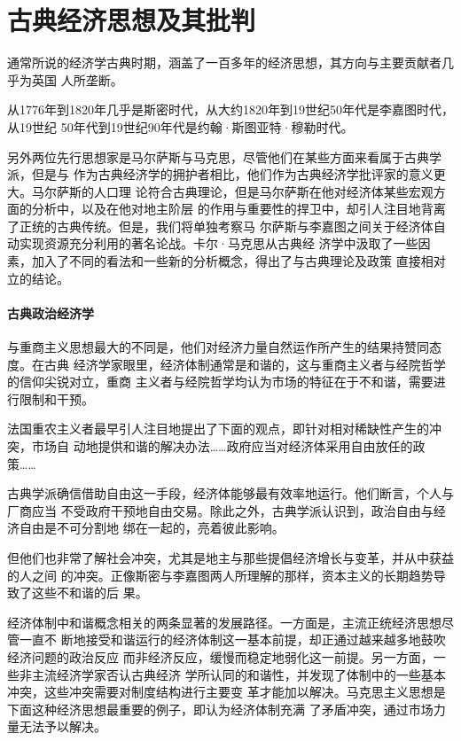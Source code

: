 \part{古典经济思想及其批判}

通常所说的经济学古典时期，涵盖了一百多年的经济思想，其方向与主要贡献者几乎为英国
人所垄断。

从1776年到1820年几乎是斯密时代，从大约1820年到19世纪50年代是李嘉图时代，从19世纪
50年代到19世纪90年代是约翰·斯图亚特·穆勒时代。

另外两位先行思想家是马尔萨斯与马克思，尽管他们在某些方面来看属于古典学派，但是与
作为古典经济学的拥护者相比，他们作为古典经济学批评家的意义更大。马尔萨斯的人口理
论符合古典理论，但是马尔萨斯在他对经济体某些宏观方面的分析中，以及在他对地主阶层
的作用与重要性的捍卫中，却引人注目地背离了正统的古典传统。但是，我们将单独考察马
尔萨斯与李嘉图之间关于经济体自动实现资源充分利用的著名论战。卡尔·马克思从古典经
济学中汲取了一些因素，加入了不同的看法和一些新的分析概念，得出了与古典理论及政策
直接相对立的结论。

\subsection{古典政治经济学}

与重商主义思想最大的不同是，他们对经济力量自然运作所产生的结果持赞同态度。在古典
经济学家眼里，经济体制通常是和谐的，这与重商主义者与经院哲学的信仰尖锐对立，重商
主义者与经院哲学均认为市场的特征在于不和谐，需要进行限制和干预。

法国重农主义者最早引人注目地提出了下面的观点，即针对相对稀缺性产生的冲突，市场自
动地提供和谐的解决办法……政府应当对经济体采用自由放任的政策……

古典学派确信借助自由这一手段，经济体能够最有效率地运行。他们断言，个人与厂商应当
不受政府干预地自由交易。除此之外，古典学派认识到，政治自由与经济自由是不可分割地
绑在一起的，亮着彼此影响。

但他们也非常了解社会冲突，尤其是地主与那些提倡经济增长与变革，并从中获益的人之间
的冲突。正像斯密与李嘉图两人所理解的那样，资本主义的长期趋势导致了这些不和谐的后
果。

经济体制中和谐概念相关的两条显著的发展路径。一方面是，主流正统经济思想尽管一直不
断地接受和谐运行的经济体制这一基本前提，却正通过越来越多地鼓吹经济问题的政治反应
而非经济反应，缓慢而稳定地弱化这一前提。另一方面，一些非主流经济学家否认古典经济
学所认同的和谐性，并发现了体制中的一些基本冲突，这些冲突需要对制度结构进行主要变
革才能加以解决。马克思主义思想是下面这种经济思想最重要的例子，即认为经济体制充满
了矛盾冲突，通过市场力量无法予以解决。

